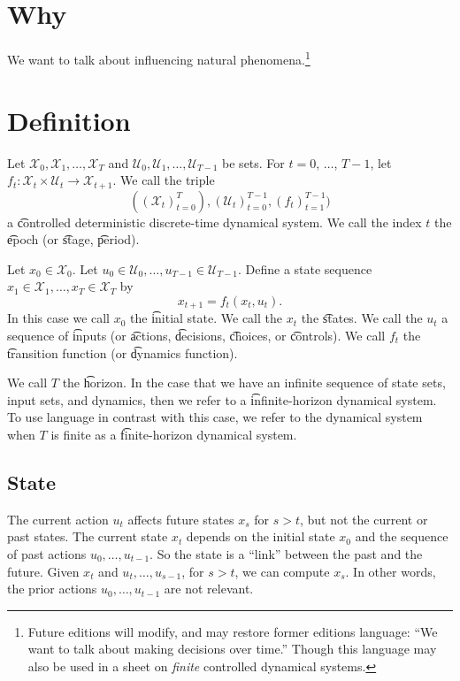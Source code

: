 
\section*{Why}

We want to talk about influencing natural phenomena.\footnote{Future editions will modify, and may restore former editions language: ``We want to talk about making decisions over time.''
Though this language may also be used in a sheet on \textit{finite} controlled dynamical systems.}

\section*{Definition}

Let $\mathcal{X} _0, \mathcal{X} _1, \dots , \mathcal{X} _{T}$ and $\mathcal{U} _0, \mathcal{U} _1, \dots , \mathcal{U} _{T-1}$ be sets.
For $t = 0$, $\dots $, $T-1$, let $f_{t}: \mathcal{X} _t \times \mathcal{U} _t \to \mathcal{X} _{t+1}$.
We call the triple
\[
((\mathcal{X} _t)_{t = 0}^{T}), (\mathcal{U} _t)_{t=0}^{T-1}, (f_t)_{t=1}^{T-1})
\]
a \t{controlled deterministic discrete-time dynamical system}.
We call the index $t$ the \t{epoch} (or \t{stage}, \t{period}).

Let $x_0 \in \mathcal{X} _0$.
Let $u_0 \in \mathcal{U} _0, \dots , u_{T-1} \in \mathcal{U} _{T-1}$. Define a state sequence $x_1 \in \mathcal{X} _1, \dots , x_T \in \mathcal{X} _T$ by
\[
x_{t+1} = f_t(x_t, u_t).
\]
In this case we call $x_0$ the \t{initial state}.
We call the $x_t$ the \t{states}.
We call the $u_t$ a sequence of \t{inputs} (or \t{actions}, \t{decisions}, \t{choices}, or \t{controls}).
We call $f_t$ the \t{transition function} (or \t{dynamics function}).

We call $T$ the \t{horizon}.
In the case that we have an infinite sequence of state sets, input sets, and dynamics, then we refer to a \t{infinite-horizon} dynamical system.
To use language in contrast with this case, we refer to the dynamical system when $T$ is finite as a \t{finite-horizon} dynamical system.

\subsection*{State}

The current action $u_t$ affects future states $x_{s}$ for $s > t$, but not the current or past states.
The current state $x_t$ depends on the initial state $x_0$ and the sequence of past actions $u_0, \dots , u_{t-1}$.
So the state is a ``link'' between the past and the future.
Given $x_t$ and $u_t, \dots , u_{s-1}$, for $s > t$, we can compute $x_s$.
In other words, the prior actions $u_0, \dots , u_{t-1}$ are not relevant.

